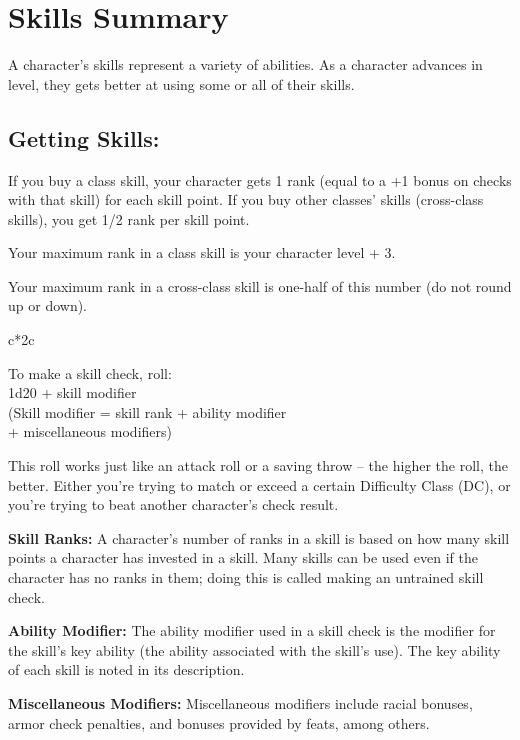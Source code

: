 \section{Skills Summary}

A character’s skills represent a variety of abilities. As a character advances in level, they gets better at using some or all of their skills.

\subsection{Getting Skills:}

If you buy a class skill, your character gets 1 rank (equal to a +1 bonus on checks  with that skill) for each skill point. If you buy other classes' skills (cross-class  skills), you get 1/2 rank per skill point.

Your maximum rank in a class skill is your character level + 3.

Your maximum rank in a cross-class skill is one-half of this number (do not round up or down).

\begin{multicolsbasictable}{c*{2}{c}}

To make a skill check, roll:\\
1d20 + skill modifier\\
(Skill modifier = skill rank + ability modifier\\
+ miscellaneous modifiers)\\
\end{multicolsbasictable}

This roll works just like an attack roll or a saving throw -- the higher the roll, the better. Either you're trying to match or exceed a certain Difficulty Class (DC), or you're trying to beat another character's check result.

\textbf{Skill Ranks:} A character's number of ranks in a skill is based on how many skill points a character has invested in a skill. Many skills can be used even if the character has no ranks in them; doing this is called making an untrained skill check.

\textbf{Ability Modifier:} The ability modifier used in a skill check is the modifier for the skill's key ability (the ability associated with the skill's use). The key ability of each skill is noted in its description.

\textbf{Miscellaneous Modifiers:} Miscellaneous modifiers include racial bonuses,  armor check penalties, and bonuses provided by feats, among others.

